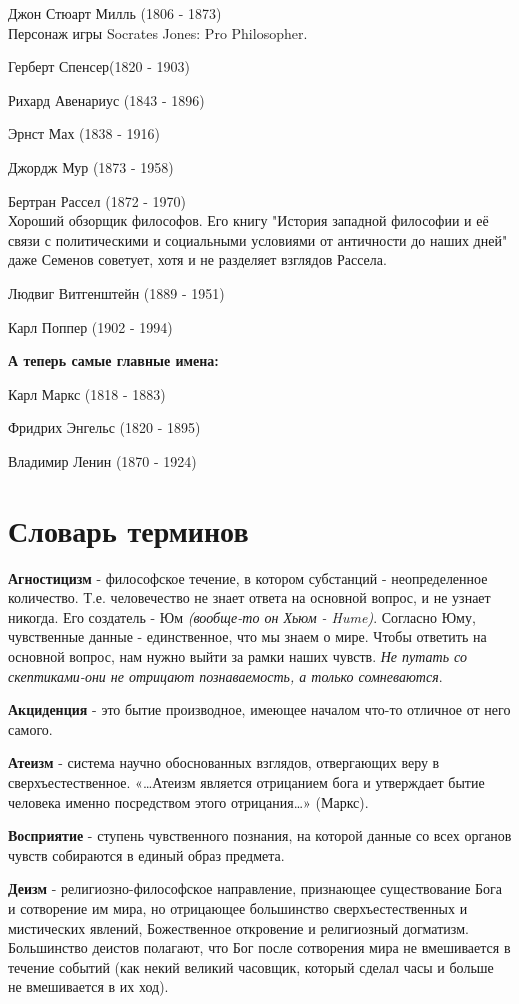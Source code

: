 \documentclass[12pt,a4paper]{article}
\begin{document}
Джон Стюарт Милль (1806 - 1873)\\
Персонаж игры Socrates Jones: Pro Philosopher.

Герберт Спенсер(1820 - 1903)

Рихард Авенариус (1843 - 1896)

Эрнст Мах (1838 - 1916)

Джордж Мур (1873 - 1958)

Бертран Рассел (1872 - 1970)\\
Хороший обзорщик философов. Его книгу "История западной философии и её связи с политическими и социальными условиями от античности до наших дней" даже Семенов советует, хотя и не разделяет взглядов Рассела.

Людвиг Витгенштейн (1889 - 1951)

Карл Поппер (1902 - 1994)

\textbf{А теперь самые главные имена:}

Карл Маркс (1818 - 1883)

Фридрих Энгельс (1820 - 1895)

Владимир Ленин (1870 - 1924)


\section{Словарь терминов}
\textbf{Агностицизм} - философское течение, в котором субстанций - неопределенное количество. Т.е. человечество не знает ответа на основной вопрос, и не узнает никогда. Его создатель - Юм \textit{(вообще-то он Хьюм - Hume)}. Согласно Юму, чувственные данные - единственное, что мы знаем о мире. Чтобы ответить на основной вопрос, нам нужно выйти за рамки наших чувств. \textit{Не путать со скептиками-они не отрицают познаваемость, а только сомневаются}.

\textbf{Акциденция} - это бытие производное, имеющее началом что-то отличное от него самого.

\textbf{Атеизм} -  система научно обоснованных взглядов, отвергающих веру в сверхъестественное. «…Атеизм является отрицанием бога и утверждает бытие человека именно посредством этого отрицания…» (Маркс).

\textbf{Восприятие} - ступень чувственного познания, на которой данные со всех органов чувств собираются в единый образ предмета.

\textbf{Деизм} -  религиозно-философское направление, признающее существование Бога и сотворение им мира, но отрицающее большинство сверхъестественных и мистических явлений, Божественное откровение и религиозный догматизм. Большинство деистов полагают, что Бог после сотворения мира не вмешивается в течение событий (как некий великий часовщик, который сделал часы и больше не вмешивается в их ход).
\end{document}
